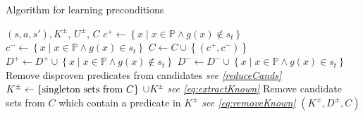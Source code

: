 \documentclass[../Master.tex]{subfiles}
\begin{document}
\begin{algorithm}
    \caption{Algorithm for learning preconditions}
    \label{algo:precondLearn}

    \begin{algorithmic}
         {$\left( s, a, s'\right), K^\pm$, $U^\pm$, $C$}
                \State $c^+ \gets
                    \left\{ x \; | \; x \in \mathbb{P} \land g(x) \notin s_t \right\}$
                \State $c^- \gets
                    \left\{ x \; | \; x \in \mathbb{P} \land g(x) \in s_t \right\}$
                \State $C \gets C \cup \left\{ \left( c^+, c^- \right) \right\}$
                \State $D^+ \gets D^+ \cup
                    \left\{
                        x \; | \; x \in \mathbb{P} \land g(x) \notin s_t
                    \right\}$
                \State $D^- \gets D^- \cup
                    \left\{
                        x \; | \; x \in \mathbb{P} \land g(x) \in s_t
                    \right\}$
            \EndIf
            \State Remove disproven predicates from candidates
            \Comment \emph{see \eqref{reduceCands}}
            \State $K^\pm \gets \left\{ \textnormal{singleton sets from } C\right\}$ $\cup K^\pm$
            \Comment \emph{see \eqref{eq:extractKnown}}
            \State Remove candidate sets from $C$ which contain a predicate in $K^\pm$
            \Comment \emph{see \eqref{eq:removeKnown}}
            \State \Return $(K^\pm, D^\pm, C)$
        \EndFunction
    \end{algorithmic}
\end{algorithm}
\end{document}
